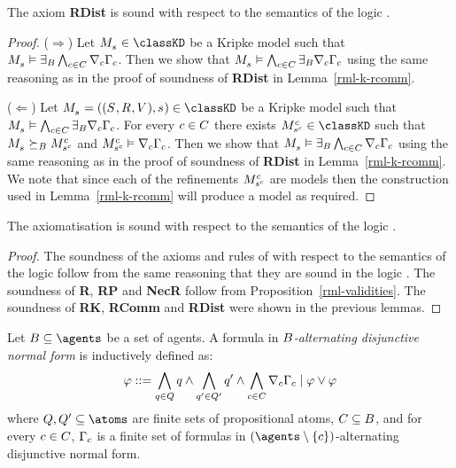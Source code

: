 \begin{lemma}
The axiom {\bf RDist} is sound with respect to the semantics of the logic \logicRmlKD{}.
\end{lemma}

\begin{proof}
($\Rightarrow$) Let $\kPModel{\kStateS} \in \classKD$ be a Kripke model such that $\kPModel{\kStateS} \entails \somerefsBs \bigwedge_{\agentC \in \agentsC} \coversC \Gamma_\agentC$.
Then we show that $\kPModel{\kStateS} \entails \bigwedge_{\agentC \in \agentsC} \somerefsBs \coversC \Gamma_\agentC$ using the same reasoning as in the proof of soundness of {\bf RDist} in Lemma~\ref{rml-k-rcomm}.

($\Leftarrow$) Let $\kPModelAndTuple{\kStateS} \in \classKD$ be a Kripke model such that $\kPModel{\kStateS} \entails \bigwedge_{\agentC \in \agentsC} \somerefsBs \coversC \Gamma_\agentC$.
For every $\agentC \in \agentsC$ there exists $\kPModel[\agentC]{\kStateS[\agentC]} \in \classKD$ such that $\kPModel{\kStateS} \simulatesBs \kPModel[\agentC]{\kStateS[\agentC]}$ and $\kPModel[\agentC]{\kStateS[\agentC]} \entails \coversC \Gamma_\agentC$.
Then we show that $\kPModel{\kStateS} \entails \somerefsBs \bigwedge_{\agentC \in \agentsC} \coversC \Gamma_\agentC$ using the same reasoning as in the proof of soundness of {\bf RDist} in Lemma~\ref{rml-k-rcomm}.
We note that since each of the refinements $\kPModel[\agentC]{\kStateS[\agentC]}$ are \classKD{} models then the construction used in Lemma~\ref{rml-k-rcomm} will produce a \classKD{} model as required.
\end{proof}

\begin{lemma}\label{rml-kd-sound}
The axiomatisation \axiomRmlKD{} is sound with respect to the semantics of the logic \logicRmlKD{}.
\end{lemma}

\begin{proof}
The soundness of the axioms and rules of \axiomKD{} with respect to the semantics of the logic \logicRmlKD{} follow from the same reasoning that they are sound in the logic \logicKD{}.
The soundness of {\bf R}, {\bf RP} and {\bf NecR} follow from Proposition~\ref{rml-validities}.
The soundness of {\bf RK}, {\bf RComm} and {\bf RDist} were shown in the previous lemmas.
\end{proof}

\begin{definition}
Let $\agentsB \subseteq \agents$ be a set of agents.
A formula in {\em $\agentsB$-alternating disjunctive normal form} is inductively defined as:
$$
\phi ::= \bigwedge_{\atomQ \in \atomsQ} \atomQ \land \bigwedge_{\atomQ' \in \atomsQ'} \atomQ' \land \bigwedge_{\agentC \in \agentsC} \coverC \Gamma_\agentC \mid \phi \lor \phi
$$
where $\atomsQ, \atomsQ' \subseteq \atoms$ are finite sets of propositional atoms, $\agentsC \subseteq \agentsB$, and for every $\agentC \in \agentsC$, $\Gamma_\agentC$ is a finite set of formulas in $(\agents \setminus \{\agentC\})$-alternating disjunctive normal form.
\end{definition}

